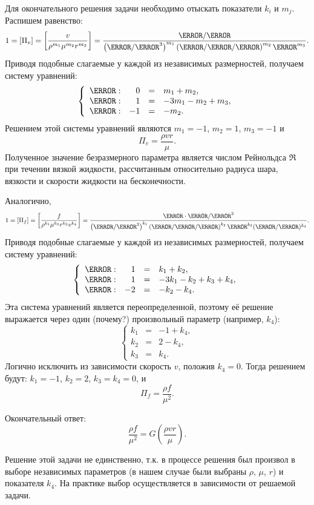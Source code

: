\documentclass[a4paper, 14pt]{extarticle}
\begin{document}
Для окончательного решения задачи необходимо отыскать показатели $k_i$ и $m_j$.
Распишем равенство:
\[
1 =  [\Pi_v] = \left[\frac{v}{\rho^{m_1} \mu^{m_2} r^{m_3}}\right] = 
\frac{\m/\s}{ 
	\left( \kg/\m^3       \right)^{m_1}
	\left(\kg/\m/\s\right)^{m_2}
	\m^{m_3}
}.
\]
Приводя подобные слагаемые у каждой из независимых размерностей, получаем систему уравнений:
\[
\left\{
\begin{array}{lrcl}
	\kg: &
	0 &  = & m_1 + m_2, \\
	\m: & 
	1 & = & -3 m_1 - m_2 + m_3,\\
	\s: &
	-1 & = &  -m_2.
\end{array}
\right.
\]
Решением этой системы уравнений являются $m_1 = -1$, $m_2 = 1$, $m_3 = -1$ и
\[
\Pi_v = \frac{\rho v r}{\mu}.
\]
Полученное значение безразмерного параметра является числом Рейнольдса $\Re$ при течении вязкой жидкости, рассчитанным относительно радиуса шара, вязкости и скорости жидкости на бесконечности.

Аналогично,
\[
1 =  [\Pi_f] = \left[\frac{f}{\rho^{k_1} \mu^{k_2} r^{k_3} v^{k_4}} \right] = 
\frac{\kg \cdot \m/\s^2}{ 
	\left( \kg/\m^3       \right)^{k_1}
	\left(\kg/\m/\s\right)^{k_2}
	\m^{k_3}
	(\m/\s)^{k_4}
}.
\]
Приводя подобные слагаемые у каждой из независимых размерностей, получаем систему уравнений:
\[
\left\{
\begin{array}{lrcl}
	\kg: &
	1 &  = & k_1 + k_2, \\
	\m: & 
	1 & = & -3 k_1 - k_2 + k_3 + k_4,\\
	\s: &
	-2 & = &  -k_2 - k_4.
\end{array}
\right.
\]
Эта система уравнений является переопределенной, поэтому её решение выражается через один (\alert{почему?}) произвольный параметр (например, $k_4$):
\[
\left\{
\begin{array}{rcl}
	k_1 & = & -1 + k_4,\\
	k_2 & = & 2 -k_4, \\
	k_3 & = & k_4.
\end{array}
\right.
\]
Логично исключить из зависимости скорость $v$, положив $k_4=0$. Тогда решением будут: $k_1=-1$, $k_2 = 2$, $k_3=k_4=0$, и 
\[
\Pi_f = \frac{\rho f}{\mu^2}.
\]

Окончательный ответ:
\[
\frac{\rho f}{\mu^2} = G\left(\frac{\rho v r}{\mu}\right).
\]

Решение этой задачи не единственно, т.к. в процессе решения был произвол в выборе независимых параметров (в нашем случае были выбраны $\rho$, $\mu$, $r$) и показателя $k_4$. На практике выбор осуществляется в зависимости от решаемой задачи.
\end{document}
